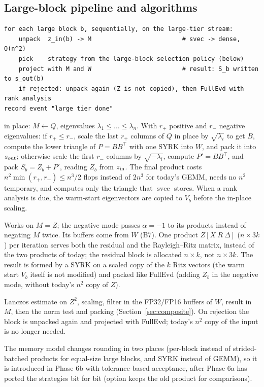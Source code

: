 \documentclass[11pt]{article}
\newcommand{\svec}{\operatorname{svec}}
\begin{document}
\subsection{Large-block pipeline and algorithms}\label{sec:large-alg}
\begin{lstlisting}[style=plain]
for each large block b, sequentially, on the large-tier stream:
    unpack  z_in(b) -> M                         # svec -> dense, O(n^2)
    pick    strategy from the large-block selection policy (below)
    project with M and W                         # result: S_b written to s_out(b)
    if rejected: unpack again (Z is not copied), then FullEvd with rank analysis
record event "large tier done"
\end{lstlisting}
\begin{description}[style=nextline,leftmargin=0.6cm]
  \item[FullEvd.]  in place: $M\leftarrow Q$, eigenvalues $\lambda_1\le\dots\le\lambda_n$.
  With $r_+$ positive and $r_-$ negative eigenvalues: if $r_+\le r_-$, scale the last $r_+$ columns of $Q$ in
  place by $\sqrt{\lambda_i}$ to get $B$, compute the lower triangle of $P = BB^\top$ with one SYRK into $W$, and
  pack it into $s_{\rm out}$; otherwise scale the first $r_-$ columns by $\sqrt{-\lambda_i}$, compute $P' =
  BB^\top$, and pack $S_b = Z_b + P'$, reading $Z_b$ from $z_{\rm in}$. The final product costs
  $n^2\min(r_+,r_-)\le n^3/2$ flops instead of $2n^3$ for today's GEMM, needs no $n^2$ temporary, and computes
  only the triangle that $\svec$ stores. When a rank analysis is due, the warm-start eigenvectors are copied
  to $V_b$ before the in-place scaling.
  \item[LOBPCG.] Works on $M = Z$; the negative mode passes $\alpha=-1$ to its products instead of negating $M$
  twice. Its buffers come from $W$ (B7). One product $Z[X\ R\ \Delta]$ ($n\times 3k$) per iteration serves both
  the residual and the Rayleigh--Ritz matrix, instead of the two products of today; the residual block is
  allocated $n\times k$, not $n\times 3k$. The result is formed by a SYRK on a scaled copy of the $k$ Ritz
  vectors (the warm start $V_b$ itself is not modified) and packed like FullEvd (adding $Z_b$ in the negative
  mode, without today's $n^2$ copy of $Z$).
  \item[Composite filter.] Lanczos estimate on $Z^2$, scaling, filter in the FP32/FP16 buffers of $W$, result in
  $M$, then the norm test and packing (Section~\ref{sec:composite}). On rejection the block is unpacked again
  and projected with FullEvd; today's $n^2$ copy of the input is no longer needed.
\end{description}
The memory model changes rounding in two places (per-block instead of strided-batched products for
equal-size large blocks, and SYRK instead of GEMM), so it is introduced in Phase 6b with tolerance-based
acceptance, after Phase 6a has ported the strategies bit for bit (option
 keeps the old product for comparisons).
\end{document}
